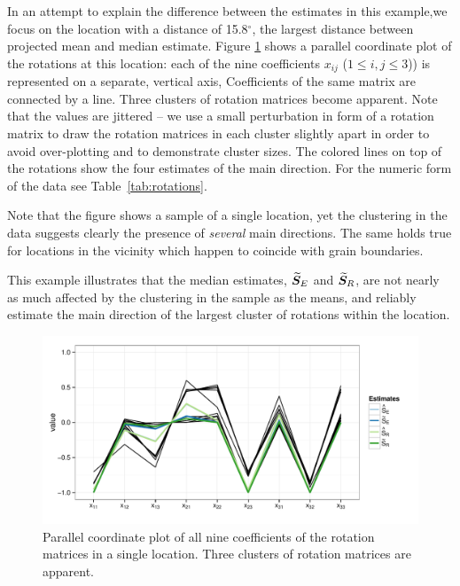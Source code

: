 \noindent In an attempt to explain the difference between the estimates in this example,we focus on the  location with a distance of 15.8$^\circ$, the largest distance between projected mean and median estimate. Figure \ref{fig:pcp} shows a parallel coordinate plot of the rotations at this location: each of the nine coefficients $x_{ij}$ ($1 \le i,j \le 3$)) is represented on a separate, vertical axis, Coefficients of the same matrix are connected by a line.  Three clusters of rotation matrices become apparent. Note that the values are jittered -- we use a small perturbation in form of a rotation matrix to draw the rotation matrices in each cluster slightly apart  in order to avoid over-plotting and to demonstrate cluster sizes. The colored lines on top of the rotations show the four estimates of the main direction.  For the numeric form of the data see Table~\ref{tab:rotations}.

\noindent Note that the figure shows a sample of a single location, yet the clustering in the data suggests clearly the presence of \emph{several} main directions. The same holds true for locations in the vicinity which happen to coincide with grain boundaries. 

\noindent This example illustrates that the median estimates, ${\widetilde{\bm S}_E}$  and ${\widetilde{\bm S}_R}$, are not nearly as much affected by the clustering in the sample as the means, and reliably estimate the main direction of the largest cluster of rotations within the location.


\begin{figure}[htbp] %
   \centering
   \includegraphics[width=.7\textwidth]{images/pcp.pdf} 
   \caption{ \label{fig:pcp}Parallel coordinate plot of all nine coefficients of the rotation matrices in a single location. Three clusters of rotation matrices are apparent.  }
\end{figure}



